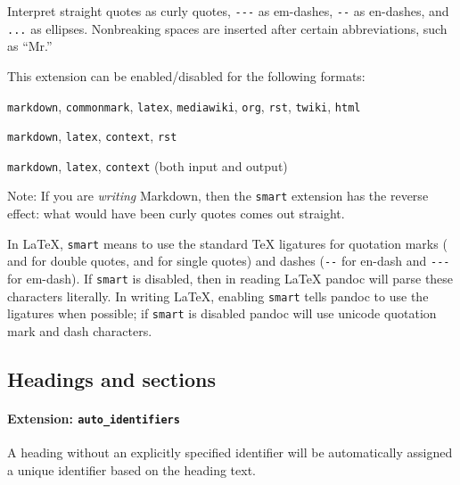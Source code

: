\documentclass[
]{article}
\providecommand{\tightlist}{%
  \setlength{\itemsep}{0pt}\setlength{\parskip}{0pt}}
\begin{document}
Interpret straight quotes as curly quotes, \texttt{-\/-\/-} as
em-dashes, \texttt{-\/-} as en-dashes, and \texttt{...} as ellipses.
Nonbreaking spaces are inserted after certain abbreviations, such as
``Mr.''

This extension can be enabled/disabled for the following formats:

\begin{description}
\tightlist
\item[input formats]
\texttt{markdown}, \texttt{commonmark}, \texttt{latex},
\texttt{mediawiki}, \texttt{org}, \texttt{rst}, \texttt{twiki},
\texttt{html}
\item[output formats]
\texttt{markdown}, \texttt{latex}, \texttt{context}, \texttt{rst}
\item[enabled by default in]
\texttt{markdown}, \texttt{latex}, \texttt{context} (both input and
output)
\end{description}

Note: If you are \emph{writing} Markdown, then the \texttt{smart}
extension has the reverse effect: what would have been curly quotes
comes out straight.

In LaTeX, \texttt{smart} means to use the standard TeX ligatures for
quotation marks (\texttt{\textasciigrave{}\textasciigrave{}} and
\texttt{\textquotesingle{}\textquotesingle{}} for double quotes,
\texttt{\textasciigrave{}} and \texttt{\textquotesingle{}} for single
quotes) and dashes (\texttt{-\/-} for en-dash and \texttt{-\/-\/-} for
em-dash). If \texttt{smart} is disabled, then in reading LaTeX pandoc
will parse these characters literally. In writing LaTeX, enabling
\texttt{smart} tells pandoc to use the ligatures when possible; if
\texttt{smart} is disabled pandoc will use unicode quotation mark and
dash characters.

\hypertarget{headings-and-sections}{%
\subsection{Headings and sections}\label{headings-and-sections}}

\hypertarget{extension-auto_identifiers}{%
\paragraph{\texorpdfstring{Extension:
\texttt{auto\_identifiers}}{Extension: auto\_identifiers}}\label{extension-auto_identifiers}}

A heading without an explicitly specified identifier will be
automatically assigned a unique identifier based on the heading text.
\end{document}
